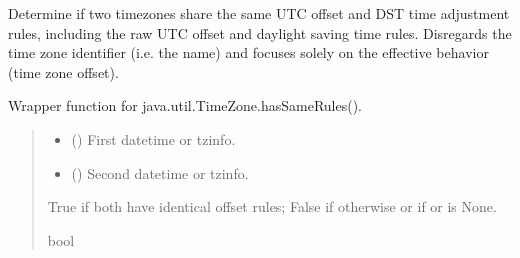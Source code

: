 \documentclass[letterpaper,10pt,english]{sphinxmanual}
\begin{document}
\begin{fulllineitems}
\label{\detokenize{apache_commons_validator_python.util:apache_commons_validator_python.util.datetime_helpers.timezone_has_same_rules}}
\pysigstartsignatures
{}
\pysigstopsignatures
\sphinxAtStartPar
Determine if two timezones share the same UTC offset and DST time adjustment rules,
including the raw UTC offset and daylight saving time rules. Disregards the
time zone identifier (i.e. the name) and focuses solely on the effective behavior
(time zone offset).

\sphinxAtStartPar
Wrapper function for java.util.TimeZone.hasSameRules().
\begin{quote}\begin{description}
\begin{itemize}
\item {} 
\sphinxAtStartPar
{} (\sphinxstyleliteralemphasis{\sphinxupquote{{[}}}\sphinxstyleliteralemphasis{\sphinxupquote{, }}\sphinxstyleliteralemphasis{\sphinxupquote{{]}}}) \textendash{} First datetime or tzinfo.

\item {} 
\sphinxAtStartPar
{} (\sphinxstyleliteralemphasis{\sphinxupquote{{[}}}\sphinxstyleliteralemphasis{\sphinxupquote{, }}\sphinxstyleliteralemphasis{\sphinxupquote{{]}}}) \textendash{} Second datetime or tzinfo.

\end{itemize}

\sphinxAtStartPar
True if both have identical offset rules; False if otherwise or if
 or  is None.

\sphinxAtStartPar
bool

\end{description}\end{quote}

\end{fulllineitems}
\end{document}
